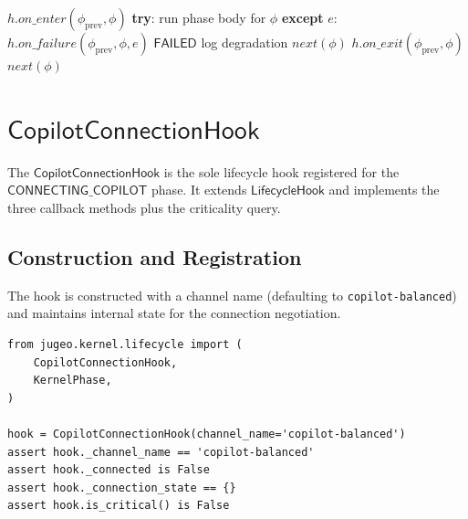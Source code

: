 \documentclass[11pt]{article}
\newcommand{\CCH}{\mathsf{CopilotConnectionHook}}
\newcommand{\KP}{\mathsf{KernelPhase}}
\newcommand{\LM}{\mathsf{LifecycleManager}}
\newcommand{\LH}{\mathsf{LifecycleHook}}
\newcommand{\CONNECTING}{\mathsf{CONNECTING\_COPILOT}}
\newcommand{\FAILED}{\mathsf{FAILED}}
\begin{document}
\begin{algorithm}[t]
\caption{$\LM$.\textsc{RunPhase}($\phi$, hooks)}
\label{alg:run-phase}
\begin{algorithmic}[1]
  \REQUIRE{$\phi \in \KP$, hooks $H = [h_1, \ldots, h_k]$}
    \STATE $h.\textit{on\_enter}(\phi_{\mathrm{prev}}, \phi)$
  \ENDFOR
  \STATE \textbf{try}:
  \STATE \quad run phase body for $\phi$
  \STATE \textbf{except} $e$:
    \STATE $h.\textit{on\_failure}(\phi_{\mathrm{prev}}, \phi, e)$
  \ENDFOR
    \RETURN $\FAILED$
  \ELSE
    \STATE log degradation
    \RETURN $\mathit{next}(\phi)$  
  \ENDIF
    \STATE $h.\textit{on\_exit}(\phi_{\mathrm{prev}}, \phi)$
  \ENDFOR
  \RETURN $\mathit{next}(\phi)$
\end{algorithmic}
\end{algorithm}

\section{\texorpdfstring{$\CCH$}{CopilotConnectionHook}}
\label{sec:hook}

The $\CCH$ is the sole lifecycle hook registered for the
$\CONNECTING$ phase.  It extends $\LH$ and
implements the three callback methods plus the criticality query.

\subsection{Construction and Registration}

The hook is constructed with a channel name (defaulting to
\texttt{copilot-balanced}) and maintains internal state for the
connection negotiation.

\begin{lstlisting}[style=jugeo-python, caption={Constructing and
  inspecting a $\CCH$.}]
from jugeo.kernel.lifecycle import (
    CopilotConnectionHook,
    KernelPhase,
)

hook = CopilotConnectionHook(channel_name='copilot-balanced')
assert hook._channel_name == 'copilot-balanced'
assert hook._connected is False
assert hook._connection_state == {}
assert hook.is_critical() is False
\end{lstlisting}
\end{document}
